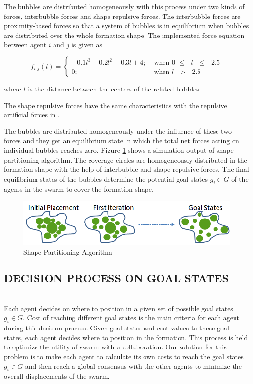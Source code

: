 \documentclass[letterpaper, 10 pt, conference]{ieeeconf}  %
\begin{document}
The bubbles are distributed homogeneously with this process under two kinds of forces, interbubble forces and shape repulsive forces. The interbubble forces are proximity-based forces so that a system of bubbles is in equilibrium when bubbles are distributed over the whole formation shape. The implemented force equation between agent $i$ and $j$ is given as
		
\begin{equation}
f_{i,j}(l) = \left\{ \begin{array}{rl}
-0.1l^3 - 0.2l^2 - 0.3l + 4; &\mbox{ when 0 $\leq$ $l$ $\leq$ $2.5$} \\
0;                               &\mbox{ when $l$ $>$ $2.5$}
\end{array} \right.
\end{equation}

where $l$ is the distance between the centers of the related bubbles. 
   	
The shape repulsive forces have the same characteristics with the repulsive artificial forces in \cite{17}.
	
The bubbles are distributed homogeneously under the influence of these two forces and they get an equilibrium state in which the total net forces acting on individual bubbles reaches zero. Figure \ref{buble_ornek} shows a simulation output of shape partitioning algorithm. The coverage circles are homogeneously distributed in the formation shape with the help of interbubble and shape repulsive forces. The final equilibrium states of the bubbles determine the potential goal states $g_i \in G$  of the agents in the swarm to cover the formation shape.

\begin{figure}[thpb]
      \centering     
      \includegraphics[scale = 0.35]{bubble_packing2}
    \caption{Shape Partitioning Algorithm} \label{buble_ornek}
\end{figure} 
	
\subsection{DECISION PROCESS ON GOAL STATES}\hspace{0pt} \label{DecisionProcess Ref} \\
Each agent decides on where to position in a given set of possible goal states $g_i \in G$. Cost of reaching different goal states is the main criteria for each agent during this decision process. Given goal states and cost values to these goal states, each agent decides where to position in the formation. This process is held to optimize the utility of swarm with a collaboration. Our solution for this problem is to make each agent to calculate its own costs to reach the goal states $g_i \in G$ and then reach a global consensus with the other agents to minimize the overall displacements of the swarm. 
\end{document}
